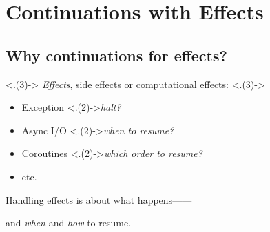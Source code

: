 \section{Continuations with Effects}
\TableOfContents{}

\subsection{Why continuations for effects?}
\begin{frame}
	\frametitlesubs{}

	{
		\only<.(3)->{\smaller[2]}
		\textit{Effects}, side effects or computational effects:
		\only<.(3)->{\vspace{-.6\zh}}

		\begin{minipage}[t]{.8\textwidth}
			\begin{itemize}
				\only<.(3)->{\setlength{\itemsep}{-.2\zh}}
				\item Exception {\only<.(2)->{\dotfill \textit{halt?}}}
				\item Async I/O {\only<.(2)->{\dotfill \textit{when to resume?}}}
				\item Coroutines {\only<.(2)->{\dotfill \textit{which order to resume?}}}
				\item etc.
			\end{itemize}
		\end{minipage}
	}

	\vspace{.6\zh}
	Handling effects is about what happens------
	\pause
	\\\centerline{\larger{}and \textit{when} and \textit{how} to \textcolor{subhighlight}{resume}.}

	\pause

	\vspace{-.4\zh}
	\centering
	\hspace*{\fill}
	\begin{minipage}[t]{.41\textwidth}
		\vspace{.6\zh}


\end{minipage}
\end{frame}
